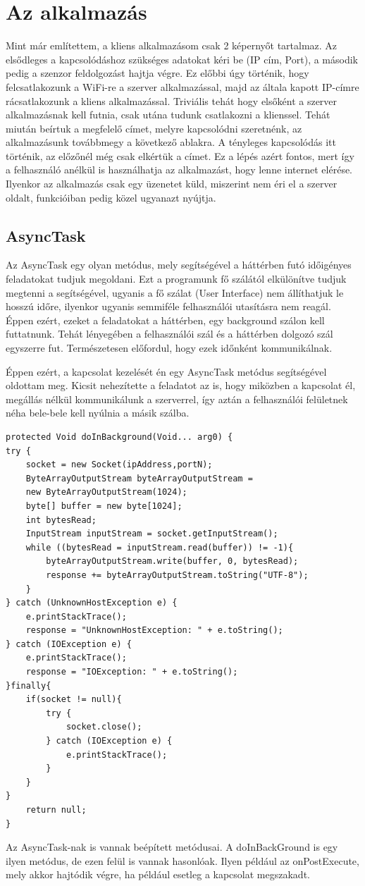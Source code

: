 \documentclass{thesis-ekf}
\theoremstyle{definition}
\theoremstyle{remark}
\begin{document}
\section{Az alkalmazás}
Mint már említettem, a kliens alkalmazásom csak 2 képernyőt tartalmaz. Az elsődleges a kapcsolódáshoz szükséges adatokat kéri be (IP cím, Port), a második pedig a szenzor feldolgozást hajtja végre. Ez előbbi úgy történik, hogy felcsatlakozunk a WiFi-re a szerver alkalmazással, majd az általa kapott IP-címre rácsatlakozunk a kliens alkalmazással. Triviális tehát hogy elsőként a szerver alkalmazásnak kell futnia, csak utána tudunk csatlakozni a klienssel. Tehát miután beírtuk a megfelelő címet, melyre kapcsolódni szeretnénk, az alkalmazásunk továbbmegy a következő ablakra. A tényleges kapcsolódás itt történik, az előzőnél még csak elkértük a címet. Ez a lépés azért fontos, mert így a felhasználó anélkül is használhatja az alkalmazást, hogy lenne internet elérése. Ilyenkor az alkalmazás csak egy üzenetet küld, miszerint nem éri el a szerver oldalt, funkcióiban pedig közel ugyanazt nyújtja.
\subsection{AsyncTask}
Az AsyncTask egy olyan metódus, mely segítségével a háttérben futó időigényes feladatokat tudjuk megoldani. Ezt a programunk fő szálától elkülönítve tudjuk megtenni a segítségével, ugyanis a fő szálat (User Interface) nem állíthatjuk le hosszú időre, ilyenkor ugyanis semmiféle felhasználói utasításra nem reagál. Éppen ezért, ezeket a feladatokat a háttérben, egy background szálon kell futtatnunk. Tehát lényegében a felhasználói szál és a háttérben dolgozó szál egyszerre fut. Természetesen előfordul, hogy ezek időnként kommunikálnak. 
\par Éppen ezért, a kapcsolat kezelését én egy AsyncTask metódus segítségével oldottam meg. Kicsit nehezítette a feladatot az is, hogy miközben a kapcsolat él, megállás nélkül kommunikálunk a szerverrel, így aztán a felhasználói felületnek néha bele-bele kell nyúlnia a másik szálba.
\begin{lstlisting}
protected Void doInBackground(Void... arg0) {
try {
    socket = new Socket(ipAddress,portN);
    ByteArrayOutputStream byteArrayOutputStream =
    new ByteArrayOutputStream(1024);
    byte[] buffer = new byte[1024];
    int bytesRead;
    InputStream inputStream = socket.getInputStream();
    while ((bytesRead = inputStream.read(buffer)) != -1){
        byteArrayOutputStream.write(buffer, 0, bytesRead);
        response += byteArrayOutputStream.toString("UTF-8");
    }
} catch (UnknownHostException e) {
    e.printStackTrace();
    response = "UnknownHostException: " + e.toString();
} catch (IOException e) {
    e.printStackTrace();
    response = "IOException: " + e.toString();
}finally{
    if(socket != null){
        try {
            socket.close();
        } catch (IOException e) {
            e.printStackTrace();
        }
    }
}
    return null;
}
\end{lstlisting}
\par Az AsyncTask-nak is vannak beépített metódusai. A doInBackGround is egy ilyen metódus, de ezen felül is vannak hasonlóak. Ilyen például az onPostExecute, mely akkor hajtódik végre, ha például esetleg a kapcsolat megszakadt.
\end{document}
